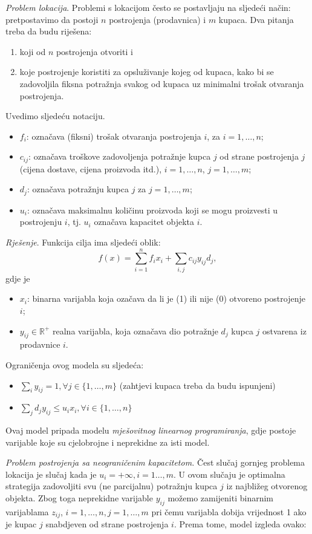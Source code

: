 \documentclass[a4paper, utf8, 11pt, colorlinks]{book}
\begin{document}
\emph{Problem lokacija}. Problemi s lokacijom često se postavljaju na sljedeći način: pretpostavimo da postoji $n$ postrojenja (prodavnica)  i  $m$ kupaca. Dva pitanja treba da budu riješena:
\begin{enumerate}
	\item koji od $n$ postrojenja otvoriti i
	\item koje  postrojenje koristiti za opsluživanje kojeg od kupaca, kako bi se zadovoljila fiksna potražnja svakog od kupaca uz minimalni trošak otvaranja postrojenja.
\end{enumerate}
Uvedimo sljedeću notaciju.
\begin{itemize}
	\item  $f_{i}$: označava (fiksni) trošak otvaranja postrojenja $i$, za  $ i = 1,  \ldots, n$;
	\item $c_{ij}$: označava troškove zadovoljenja potražnje  kupca $j$ od strane postrojenja $j$ (cijena dostave, cijena proizvoda itd.), $i = 1, \ldots, n$, $j = 1,  \ldots, m$;
	\item $d_{j}$: označava potražnju kupca $j$ za $j = 1, \ldots, m$;
	\item $u_{i}$: označava maksimalnu količinu proizvoda koji se mogu proizvesti u postrojenju $i$, tj. $u_{i}$ označava kapacitet objekta $i$.
\end{itemize}

\emph{Rješenje}. Funkcija cilja ima sljedeći oblik:
$$ f(x) = \sum_{i=1}^n f_i x_i  + \sum_{i,j} c_{ij} y_{ij} d_j,$$
gdje je
\begin{itemize}
	\item $x_i$: binarna varijabla koja ozačava da li je (1) ili nije (0) otvoreno postrojenje $i$;
	\item $y_{ij} \in \mathbb{R}^+$ realna varijabla, koja označava dio potražnje $d_j$ kupca $j$ ostvarena iz prodavnice $i$.
\end{itemize}
Ograničenja ovog modela su sljedeća:
\begin{itemize}
	\item $\sum_{i} y_{ij} = 1, \forall j\in\{1,\ldots,m\}$ (zahtjevi kupaca treba da budu ispunjeni)
	\item $\sum_{j} d_j y_{ij} \leq u_i x_i, \forall i \in \{1,\ldots,n\}$
\end{itemize}
Ovaj model pripada modelu \emph{mješovitnog linearnog programiranja}, gdje postoje varijable koje su cjelobrojne i neprekidne za isti model.

\emph{Problem postrojenja sa neograničenim kapacitetom.}
Čest slučaj gornjeg problema lokacija je slučaj kada je  $ u_{i} = + \infty,i=1\ldots,m$. U ovom slučaju je optimalna strategija zadovoljiti svu (ne parcijalnu) potražnju kupca $j$ iz najbližeg otvorenog objekta. Zbog toga neprekidne varijable  $y_{ij}$ možemo zamijeniti binarnim varijablama $z_{ij}$, $i=1,\ldots,n, j=1,\ldots,m$ pri čemu varijabla dobija vrijednost 1 ako je kupac $j$ snabdjeven od strane postrojenja $i$. Prema tome, model izgleda ovako:
\end{document}
